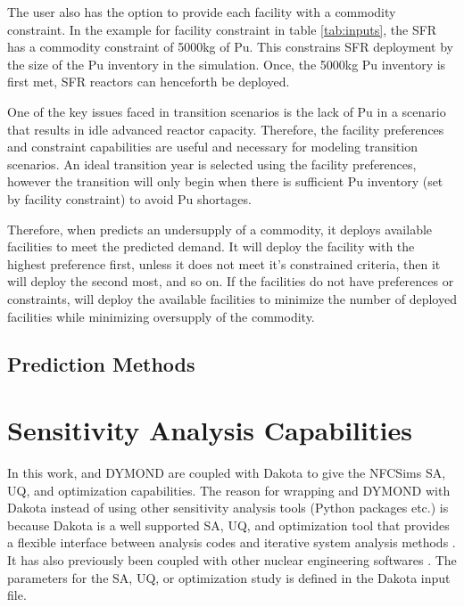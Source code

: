     The user also has the option to provide each facility with a 
    commodity constraint. 
    In the example for facility constraint in table \ref{tab:inputs}, 
    the \gls{SFR} has a commodity constraint of 5000kg of Pu. 
    This constrains \gls{SFR} deployment by the size of the Pu inventory 
    in the simulation. 
    Once, the 5000kg Pu inventory is first met, \gls{SFR} reactors can 
    henceforth be deployed. 
    
    One of the key issues faced in transition scenarios is the lack 
    of Pu in a scenario that results in idle advanced reactor capacity. 
    Therefore, the facility preferences and constraint capabilities 
    are useful and necessary for modeling transition scenarios. 
    An ideal transition year is selected using the facility 
    preferences, however the transition will only begin when there 
    is sufficient Pu inventory (set by facility constraint) 
    to avoid Pu shortages. 
    
    Therefore, when \deploy predicts an undersupply of a commodity, 
    it deploys available facilities to meet the predicted demand. 
    It will deploy the facility with the highest preference first, 
    unless it does not meet it's constrained criteria, then it will 
    deploy the second most, and so on. 
    If the facilities do not have preferences or constraints, \deploy 
    will deploy the available facilities to minimize the number of 
    deployed facilities while minimizing oversupply of the commodity.

\subsection{\textbf{Prediction Methods}}


\section{Sensitivity Analysis Capabilities}
In this work, \Cyclus and DYMOND are coupled with Dakota 
\cite{eldred_dakota_2010} to give the \glspl{NFCSim} \gls{SA}, 
\gls{UQ}, and optimization capabilities. 
The reason for wrapping \Cyclus and DYMOND with Dakota instead of 
using other sensitivity analysis tools (Python packages etc.)
is because Dakota is a well supported \gls{SA}, \gls{UQ}, 
and optimization tool that provides a flexible interface between 
analysis codes and iterative system analysis methods 
\cite{turner_virtual_nodate}. 
It has also previously been coupled with other nuclear engineering 
softwares \cite{turner_virtual_nodate,zhang_uncertainty_nodate}. 
The parameters for the \gls{SA}, \gls{UQ}, or optimization study is defined 
in the Dakota input file. 

